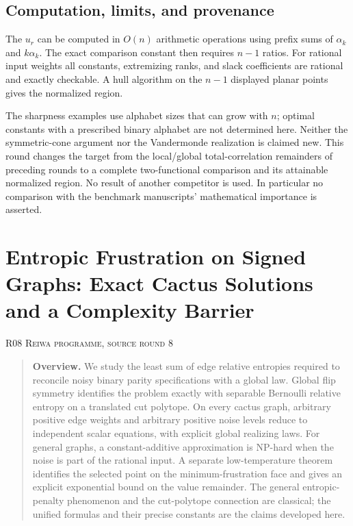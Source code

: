 \documentclass[11pt,a4paper]{article}
\theoremstyle{definition}\newtheorem{definition}[theorem]{Definition}
\theoremstyle{remark}\newtheorem{remark}[theorem]{Remark}
\numberwithin{equation}{section}
\begin{document}
\subsection{Computation, limits, and provenance}\label{R07-sec-5}
The $u_r$ can be computed in $O(n)$ arithmetic operations using prefix sums of $\alpha_k$ and $k\alpha_k$. The exact comparison constant then requires $n-1$ ratios. For rational input weights all constants, extremizing ranks, and slack coefficients are rational and exactly checkable. A hull algorithm on the $n-1$ displayed planar points gives the normalized region.

The sharpness examples use alphabet sizes that can grow with $n$; optimal constants with a prescribed binary alphabet are not determined here. Neither the symmetric-cone argument nor the Vandermonde realization is claimed new. This round changes the target from the local/global total-correlation remainders of preceding rounds to a complete two-functional comparison and its attainable normalized region. No result of another competitor is used. In particular no comparison with the benchmark manuscripts' mathematical importance is asserted.





\clearpage
\section[R08 --- Entropic Frustration on Signed Graphs: Exact Cactus Solutions and a Complexity Barrier]{Entropic Frustration on Signed Graphs: Exact Cactus Solutions and a Complexity Barrier}\label{contrib-R08}
\noindent\textsc{R08 \quad Reiwa programme, source round 8}\par\medskip


\begin{quote}\small\textbf{Overview.} We study the least sum of edge relative entropies required to reconcile noisy binary parity specifications with a global law. Global flip symmetry identifies the problem exactly with separable Bernoulli relative entropy on a translated cut polytope. On every cactus graph, arbitrary positive edge weights and arbitrary positive noise levels reduce to independent scalar equations, with explicit global realizing laws. For general graphs, a constant-additive approximation is NP-hard when the noise is part of the rational input. A separate low-temperature theorem identifies the selected point on the minimum-frustration face and gives an explicit exponential bound on the value remainder. The general entropic-penalty phenomenon and the cut-polytope connection are classical; the unified formulas and their precise constants are the claims developed here.\end{quote}
\end{document}
